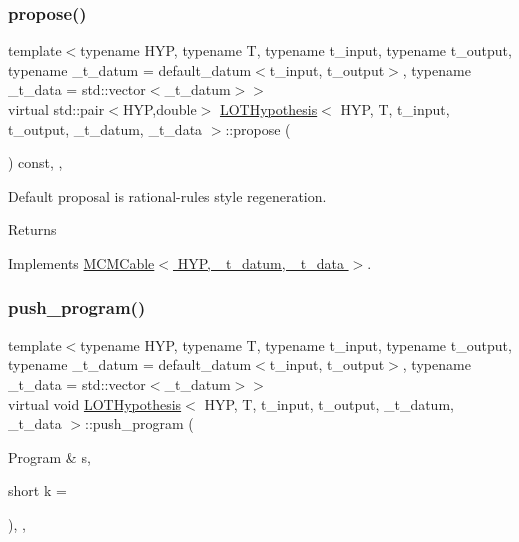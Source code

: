 \mbox{\label{class_l_o_t_hypothesis_a5ae913b145b15308d5817c6e7b1da14d}} 
\subsubsection{\texorpdfstring{propose()}{propose()}}
{\footnotesize\ttfamily template$<$typename H\+YP, typename T, typename t\+\_\+input, typename t\+\_\+output, typename \+\_\+t\+\_\+datum = default\+\_\+datum$<$t\+\_\+input, t\+\_\+output$>$, typename \+\_\+t\+\_\+data = std\+::vector$<$\+\_\+t\+\_\+datum$>$$>$ \\
virtual std\+::pair$<$H\+YP,double$>$ \hyperlink{class_l_o_t_hypothesis}{L\+O\+T\+Hypothesis}$<$ H\+YP, T, t\+\_\+input, t\+\_\+output, \+\_\+t\+\_\+datum, \+\_\+t\+\_\+data $>$\+::propose (\begin{DoxyParamCaption}{ }\end{DoxyParamCaption}) const\hspace{0.3cm}{\ttfamily [inline]}, {\ttfamily [override]}, {\ttfamily [virtual]}}

Default proposal is rational-\/rules style regeneration. \begin{DoxyReturn}{Returns}

\end{DoxyReturn}


Implements \hyperlink{class_m_c_m_cable_ab119a14256ab92c5c1e941f8492df830}{M\+C\+M\+Cable$<$ H\+Y\+P, \+\_\+t\+\_\+datum, \+\_\+t\+\_\+data $>$}.

\mbox{\label{class_l_o_t_hypothesis_aff3a378ab1137e2b46f225a028343a1c}} 
\subsubsection{\texorpdfstring{push\+\_\+program()}{push\_program()}}
{\footnotesize\ttfamily template$<$typename H\+YP, typename T, typename t\+\_\+input, typename t\+\_\+output, typename \+\_\+t\+\_\+datum = default\+\_\+datum$<$t\+\_\+input, t\+\_\+output$>$, typename \+\_\+t\+\_\+data = std\+::vector$<$\+\_\+t\+\_\+datum$>$$>$ \\
virtual void \hyperlink{class_l_o_t_hypothesis}{L\+O\+T\+Hypothesis}$<$ H\+YP, T, t\+\_\+input, t\+\_\+output, \+\_\+t\+\_\+datum, \+\_\+t\+\_\+data $>$\+::push\+\_\+program (\begin{DoxyParamCaption}\item[{Program \&}]{s,  }\item[{short}]{k = {} }\end{DoxyParamCaption})\hspace{0.3cm}{\ttfamily [inline]}, {\ttfamily [override]}, {\ttfamily [virtual]}}



